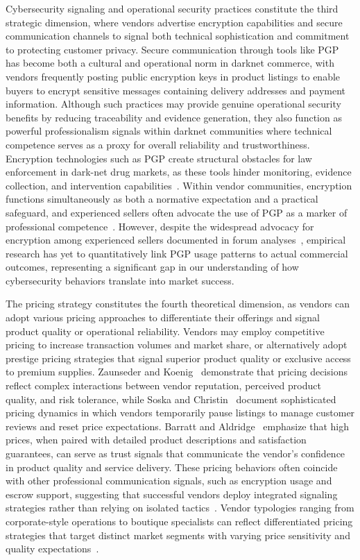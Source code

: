 \documentclass{article}
\begin{document}
Cybersecurity signaling and operational security practices constitute the third strategic dimension, where vendors advertise encryption capabilities and secure communication channels to signal both technical sophistication and commitment to protecting customer privacy. Secure communication through tools like PGP has become both a cultural and operational norm in darknet commerce, with vendors frequently posting public encryption keys in product listings to enable buyers to encrypt sensitive messages containing delivery addresses and payment information. Although such practices may provide genuine operational security benefits by reducing traceability and evidence generation, they also function as powerful professionalism signals within darknet communities where technical competence serves as a proxy for overall reliability and trustworthiness. Encryption technologies such as PGP create structural obstacles for law enforcement in dark-net drug markets, as these tools hinder monitoring, evidence collection, and intervention capabilities~\cite{unodc2020}. Within vendor communities, encryption functions simultaneously as both a normative expectation and a practical safeguard, and experienced sellers often advocate the use of PGP as a marker of professional competence~\cite{dwyer2022}. However, despite the widespread advocacy for encryption among experienced sellers documented in forum analyses~\cite{dwyer2022}, empirical research has yet to quantitatively link PGP usage patterns to actual commercial outcomes, representing a significant gap in our understanding of how cybersecurity behaviors translate into market success.

The pricing strategy constitutes the fourth theoretical dimension, as vendors can adopt various pricing approaches to differentiate their offerings and signal product quality or operational reliability. Vendors may employ competitive pricing to increase transaction volumes and market share, or alternatively adopt prestige pricing strategies that signal superior product quality or exclusive access to premium supplies. Zaunseder and Koenig~\cite{zaunseder2020} demonstrate that pricing decisions reflect complex interactions between vendor reputation, perceived product quality, and risk tolerance, while Soska and Christin~\cite{soska2015} document sophisticated pricing dynamics in which vendors temporarily pause listings to manage customer reviews and reset price expectations. Barratt and Aldridge~\cite{barratt2016} emphasize that high prices, when paired with detailed product descriptions and satisfaction guarantees, can serve as trust signals that communicate the vendor's confidence in product quality and service delivery. These pricing behaviors often coincide with other professional communication signals, such as encryption usage and escrow support, suggesting that successful vendors deploy integrated signaling strategies rather than relying on isolated tactics~\cite{vanhout2014, martin2014}. Vendor typologies ranging from corporate-style operations to boutique specialists can reflect differentiated pricing strategies that target distinct market segments with varying price sensitivity and quality expectations~\cite{munksgaard2016}.
\end{document}
